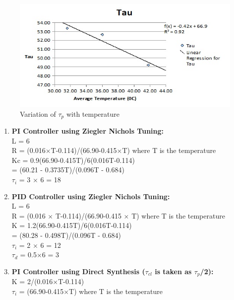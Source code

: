 \begin{figure}
\centering
	\includegraphics[width = \textwidth]{Vikas_self/report_tex/parameter_estimation/taup.jpg}
		\caption{Variation of $\tau_p$ with temperature}
	\label{taup}
\end{figure}
\newpage
\begin{enumerate}
	\item \textbf{PI Controller using Ziegler Nichols Tuning:} \\
	
	L = 6\\
	R = (0.016$\times$T-0.114)/(66.90-0.415$\times$T) where T is the temperature\\
	Kc = 0.9(66.90-0.415T)/6(0.016T-0.114) \\
		 = (60.21 - 0.3735T)/(0.096T - 0.684)\\
	$\tau_i$ = 3 $\times$ 6 = 18\\

	\item \textbf{PID Controller using Ziegler Nichols Tuning:} \\
	
	L = 6\\
	R = (0.016 $\times$ T-0.114)/(66.90-0.415 $\times$ T) where T is the temperature\\
	K = 1.2(66.90-0.415T)/6(0.016T-0.114)\\
		= (80.28 - 0.498T)/(0.096T - 0.684)\\
	$\tau_i$ = 2 $\times$ 6 = 12\\
	$\tau_d$ = 0.5$\times$6 = 3\\

	\item \textbf{PI Controller using Direct Synthesis ($\tau_{cl}$ is taken as $\tau_p$/2):}\\

	K = 2/(0.016$\times$T-0.114)\\
	$\tau_i$ = (66.90-0.415$\times$T) where T is the temperature\\

\end{enumerate}


